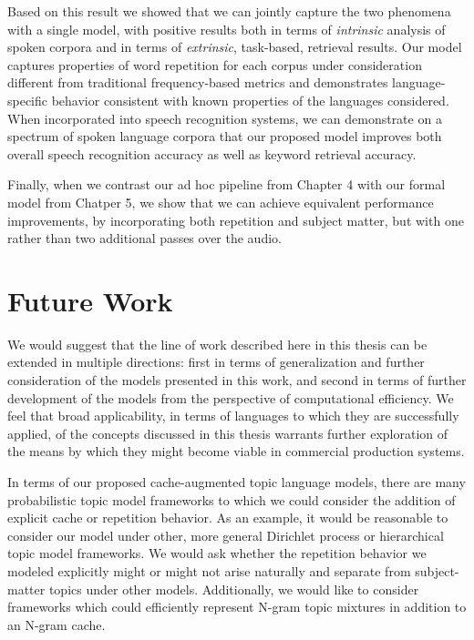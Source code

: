 Based on this result we showed that we can jointly capture the two phenomena with a single model, with positive results both in terms of \textit{intrinsic} analysis of spoken corpora and in terms of \textit{extrinsic}, task-based, retrieval results.  Our model captures properties of word repetition for each corpus under consideration different from traditional frequency-based metrics and demonstrates language-specific behavior consistent with known properties of the languages considered.    When incorporated into speech recognition systems, we can demonstrate on a spectrum of spoken language corpora that our proposed model improves both overall speech recognition accuracy as well as keyword retrieval accuracy.

Finally, when we contrast our ad hoc pipeline from Chapter 4 with our formal model from Chatper 5, we show that we can achieve equivalent performance improvements, by incorporating both repetition and subject matter, but with one rather than two additional passes over the audio.

\section{Future Work}

We would suggest that the line of work described here in this thesis can be extended in multiple directions:  first in terms of generalization and further consideration of the models presented in this work, and second in terms of further development of the models from the perspective of computational efficiency.  We feel that broad applicability, in terms of languages to which they are successfully applied, of the concepts discussed in this thesis warrants further exploration of the means by which they might become viable in commercial production systems.

In terms of our proposed cache-augmented topic language models, there are many probabilistic topic model frameworks to which we could consider the addition of explicit cache or repetition behavior.  As an example, it would be reasonable to consider our model under other, more general Dirichlet process or hierarchical topic model frameworks.  We would ask whether the repetition behavior we modeled explicitly might or might not arise naturally and separate from subject-matter topics under other models.  Additionally, we would like to consider frameworks which could efficiently represent N-gram topic mixtures in addition to an N-gram cache.

